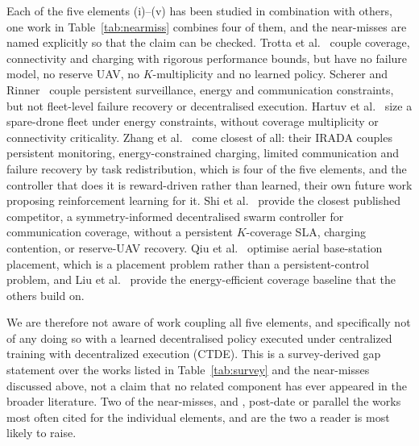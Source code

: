 \documentclass[conference]{IEEEtran}
\begin{document}
Each of the five elements (i)--(v) has been studied in combination with others, one work in Table~\ref{tab:nearmiss} combines four of them, and the near-misses are named explicitly so that the claim can be checked. Trotta et al.~\cite{trotta2018} couple coverage, connectivity and charging with rigorous performance bounds, but have no failure model, no reserve UAV, no $K$-multiplicity and no learned policy. Scherer and Rinner~\cite{scherer2016} couple persistent surveillance, energy and communication constraints, but not fleet-level failure recovery or decentralised execution. Hartuv et al.~\cite{hartuv2018} size a spare-drone fleet under energy constraints, without coverage multiplicity or connectivity criticality. Zhang et al.~\cite{zhang2025} come closest of all: their IRADA couples persistent monitoring, energy-constrained charging, limited communication and failure recovery by task redistribution, which is four of the five elements, and the controller that does it is reward-driven rather than learned, their own future work proposing reinforcement learning for it. Shi et al.~\cite{shi2025} provide the closest published competitor, a symmetry-informed decentralised swarm controller for communication coverage, without a persistent $K$-coverage SLA, charging contention, or reserve-UAV recovery. Qiu et al.~\cite{qiu2020} optimise aerial base-station placement, which is a placement problem rather than a persistent-control problem, and Liu et al.~\cite{liu2018} provide the energy-efficient coverage baseline that the others build on.

We are therefore not aware of work coupling all five elements, and specifically not of any doing so with a learned decentralised policy executed under centralized training with decentralized execution (CTDE). This is a survey-derived gap statement over the works listed in Table~\ref{tab:survey} and the near-misses discussed above, not a claim that no related component has ever appeared in the broader literature. Two of the near-misses, \cite{trotta2018} and \cite{shi2025}, post-date or parallel the works most often cited for the individual elements, and are the two a reader is most likely to raise.
\end{document}
